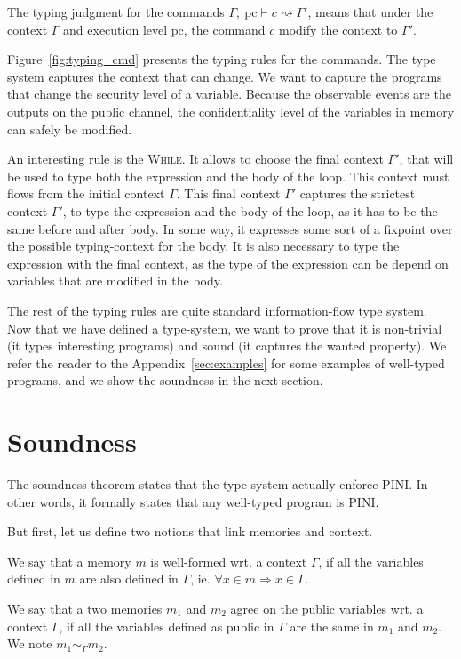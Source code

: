 \documentclass[10pt]{article}
\newcommand{\pc}{\mathrm{pc}}
\newcommand{\ctx}{\Gamma}
\newcommand{\typing}[4]{ #1,~#2 \vdash #3 \rightsquigarrow #4}
\newcommand{\agree}[3]{#2 \sim_{#1} #3}
\begin{document}
The typing judgment for the commands \( \typing{\ctx}{\pc}{c}{\ctx'} \), means that under the context
\( \ctx \) and execution level \( \pc \), the command \( c \) modify the context to $\ctx'$.

Figure~\ref{fig:typing_cmd} presents the typing rules for the commands. 
The type system captures the context that can change. We want to capture the programs that change
the security level of a variable. Because the observable events are the outputs on the public
channel, the confidentiality level of the variables in memory can safely be modified.

An interesting rule is the \textsc{While}. It allows to choose the final context $\ctx'$, that will
be used to type both the expression and the body of the loop. This context must flows from the
initial context $\ctx$.
This final context $\ctx'$ captures the strictest context $\ctx'$, to type the expression and the
body of the loop, as it has to be the same before and after body. In some way, it expresses some
sort of a fixpoint over the possible typing-context for the body. It is also necessary to type the
expression with the final context, as the type of the expression can be depend on variables that are
modified in the body.

The rest of the typing rules are quite standard information-flow type system. Now that we have
defined a type-system, we want to prove that it is non-trivial (it types interesting programs) and
sound (it captures the wanted property). We refer the reader to the
Appendix~\ref{sec:examples} for some examples of well-typed programs, and we show the soundness in
the next section.

\section{Soundness}%
\label{sec:soundness}

The soundness theorem states that the type system actually enforce PINI. In other words, it
formally states that any well-typed program is PINI.

But first, let us define two notions that link memories and context.

We say that a memory $m$ is well-formed wrt. a context $\ctx$, if all the variables defined in $m$
are also defined in $\ctx$, ie. $\forall x \in m \Rightarrow x \in \ctx$.

We say that a two memories $m_{1}$ and $m_{2}$ agree on the public variables wrt. a context $\ctx$,
if all the variables defined as public in $\ctx$ are the same in $m_{1}$ and $m_{2}$. We note
$\agree{\ctx}{m_{1}}{m_{2}}$.
\end{document}

